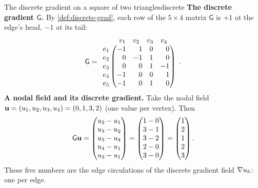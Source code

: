 \begin{workedexample}{The discrete gradient on a square of two triangles}{discrete}
\textbf{The discrete gradient $\mathsf{G}$.} By \cref{def:discrete-grad}, each row of
the $5\times 4$ matrix $\mathsf{G}$ is $+1$ at the edge's head, $-1$ at its tail:
\[
  \mathsf{G} =
  \begin{array}{c@{\,}c}
  & \begin{matrix} v_1 & v_2 & v_3 & v_4 \end{matrix}\\
  \begin{matrix} e_1\\ e_2\\ e_3\\ e_4\\ e_5 \end{matrix} &
  \begin{pmatrix*}[r]
    -1 & 1 & 0 & 0\\
     0 & -1 & 1 & 0\\
     0 & 0 & 1 & -1\\
    -1 & 0 & 0 & 1\\
    -1 & 0 & 1 & 0
  \end{pmatrix*}
  \end{array}.
\]
\textbf{A nodal field and its discrete gradient.} Take the nodal field
$\mathbf{u}=(u_1,u_2,u_3,u_4)=(0,1,3,2)$ (one value per vertex). Then
\[
  \mathsf{G}\vu =
  \begin{pmatrix*}[r]
    u_2-u_1\\ u_3-u_2\\ u_3-u_4\\ u_4-u_1\\ u_3-u_1
  \end{pmatrix*}
  =
  \begin{pmatrix*}[r]
    1-0\\ 3-1\\ 3-2\\ 2-0\\ 3-0
  \end{pmatrix*}
  =
  \begin{pmatrix*}[r] 1\\ 2\\ 1\\ 2\\ 3 \end{pmatrix*}.
\]
These five numbers are the edge circulations of the discrete gradient field
$\nabla u_h$: one per edge.


\end{workedexample}
